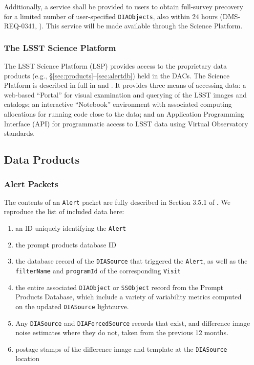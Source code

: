 Additionally, a service shall be provided to users to obtain full-survey precovery for a limited number of user-specified {\tt DIAObjects}, also within 24 hours (DMS-REQ-0341, ).
This service will be made available through the Science Platform.

\subsubsection{The LSST Science Platform} \label{sec:LSP}

The LSST Science Platform (LSP) provides access to the proprietary data products (e.g., \S \ref{sec:products}--\ref{sec:alertdb}) held in the DACs.
The Science Platform is described in full in  and .
It provides three means of accessing data: a web-based ``Portal'' for visual examination and querying of the LSST images and catalogs;
an interactive ``Notebook'' environment with associated computing allocations for running code close to the data;
and an Application Programming Interface (API) for programmatic access to LSST data using Virtual Observatory standards.

\subsection{Data Products}
\subsubsection{Alert Packets}\label{sec:packets}

The contents of an {\tt Alert} packet are fully described in Section 3.5.1 of . We reproduce the list of included data here:
\renewcommand{\labelenumi}{\Roman{enumi}.}
\begin{enumerate}
\item an ID uniquely identifying the {\tt Alert}
\item the prompt products database ID
\item the database record of the {\tt DIASource} that triggered the {\tt Alert}, as well as the \texttt{filterName} and \texttt{programId} of the corresponding \texttt{Visit}
\item the entire associated {\tt DIAObject} or {\tt SSObject} record from the Prompt Products Database, which include a variety of variability metrics computed on the
updated \texttt{DIASource} lightcurve.
\item Any \texttt{DIASource} and \texttt{DIAForcedSource} records that exist, and difference image noise estimates where they do not, taken from the previous 12 months.
\item postage stamps of the difference image and template at the {\tt DIASource} location
\end{enumerate}

